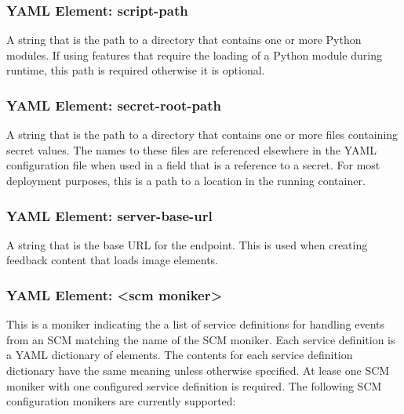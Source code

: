 \subsubsection{YAML Element: script-path}\label{sec:yaml-script-path}

A string that is the path to a directory that contains one or more Python modules.  If using features that
require the loading of a Python module during \cxoneflow runtime, this path is required otherwise it is
optional. 

\subsubsection{YAML Element: secret-root-path}\label{sec:yaml-secret-root-path}

A string that is the path to a directory that contains one or more files containing secret values.  The names to these files are 
referenced elsewhere in the YAML configuration file when used in a field that is a reference to a secret.  For most deployment
purposes, this is a path to a location in the \cxoneflow running container.

\subsubsection{YAML Element: server-base-url}\label{sec:yaml-server-base-url}
A string that is the base URL for the \cxoneflow endpoint.  This is used when creating feedback content that loads image elements.

\subsubsection{YAML Element: <scm moniker>}\label{sec:yaml-scm-monikers}

This is a moniker indicating the a list of service definitions for handling events from an SCM matching the name of the SCM
moniker.  Each service definition is a YAML dictionary of elements. The contents for each service definition dictionary 
have the same meaning unless otherwise specified.  At lease one SCM moniker with one configured service definition is required. 
The following SCM configuration monikers are currently supported:

